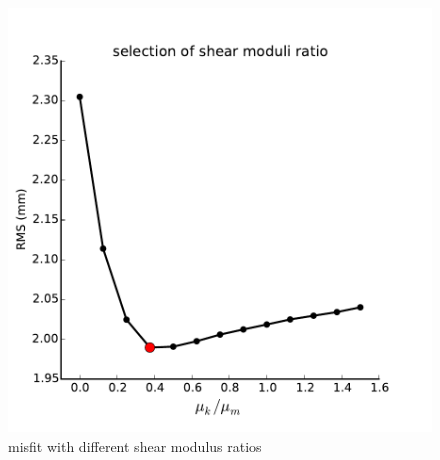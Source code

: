 \documentclass[1p]{elsarticle}
\begin{document}
\begin{figure}
\includegraphics[scale=1.0]{Figures/shear_ratio}
\centering 
\caption{misfit with different shear modulus ratios}
\label{fig:ShearModulusRatio}
\end{figure} 
\end{document}
